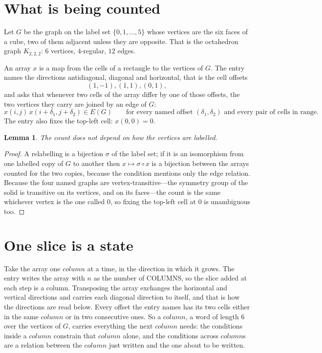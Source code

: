 \documentclass[11pt,a4paper]{article}
\theoremstyle{plain}
\newtheorem{lemma}[theorem]{Lemma}
\theoremstyle{definition}
\begin{document}
\section{What is being counted}

Let $G$ be the graph on the label set $\{0,1,\dots,5\}$ whose vertices are the six faces of a cube, two of them adjacent unless they are opposite. That is the octahedron graph $K_{2,2,2}$: $6$ vertices, $4$-regular, $12$ edges.

An array $x$ is a map from the cells of a rectangle to the vertices of $G$. The entry names the
directions antidiagonal, diagonal and horizontal, that is the cell offsets
\[
(1,-1), (1,1), (0,1),
\]
and asks that whenever two cells of the array differ by one of those offsets, the two vertices
they carry are joined by an edge of $G$:
\[
x(i,j)\,x(i+\delta_1,j+\delta_2)\in E(G)\qquad
\text{for every named offset } (\delta_1,\delta_2)\text{ and every pair of cells in range.}
\]
The entry also fixes the top-left cell: $x(0,0)=0$.

\begin{lemma}\label{lem:label}
The count does not depend on how the vertices are labelled.
\end{lemma}

\begin{proof}
A relabelling is a bijection $\sigma$ of the label set; if it is an isomorphism from one
labelled copy of $G$ to another then $x\mapsto\sigma\circ x$ is a bijection between the arrays
counted for the two copies, because the condition mentions only the edge relation.
Because the four named graphs are vertex-transitive---the symmetry group of the solid is transitive on its vertices, and on its faces---the count is the same whichever vertex is the one called $0$, so fixing the top-left cell at $0$ is unambiguous too.
\end{proof}

\section{One slice is a state}

Take the array one $column$ at a time, in the direction in which it grows. The entry writes the array with $n$ as the number of COLUMNS, so the slice added at each step is a column. Transposing the array exchanges the horizontal and vertical directions and carries each diagonal direction to itself, and that is how the directions are read below.
Every offset the entry names has its two cells either in the same $column$ or in two
consecutive ones. So a $column$, a word of length $6$ over the vertices of $G$, carries
everything the next $column$ needs: the conditions inside a $column$ constrain that
$column$ alone, and the conditions across $column$s are a relation between the
$column$ just written and the one about to be written.
\end{document}
